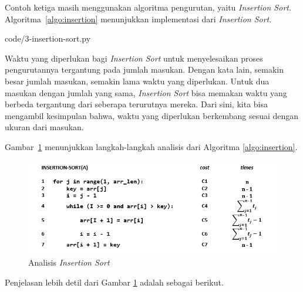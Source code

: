 Contoh ketiga masih menggunakan algoritma pengurutan, yaitu \textit{Insertion Sort}. Algoritma~\ref{algo:insertion} menunjukkan implementasi dari \textit{Insertion Sort}.


                {code/3-insertion-sort.py}

Waktu yang diperlukan bagi \textit{Insertion Sort} untuk menyelesaikan proses pengurutannya tergantung pada jumlah masukan. Dengan kata lain, semakin besar jumlah masukan, semakin lama waktu yang diperlukan. Untuk dua masukan dengan jumlah yang sama, \textit{Insertion Sort} bisa memakan waktu yang berbeda tergantung dari seberapa terurutnya mereka. Dari sini, kita bisa mengambil kesimpulan bahwa, waktu yang diperlukan berkembang sesuai dengan ukuran dari masukan.

Gambar~\ref{fig:analisis-insertion-sort} menunjukkan langkah-langkah analisis dari Algoritma \ref{algo:insertion}.

\begin{figure}[htbp]%
	\includegraphics[scale=0.7]{fig/InsertionSortAnalysis.png}%
	\caption{Analisis \textit{Insertion Sort}}%
	\label{fig:analisis-insertion-sort}%
\end{figure}

\FloatBarrier

Penjelasan lebih detil dari Gambar \ref{fig:analisis-insertion-sort} adalah sebagai berikut.

